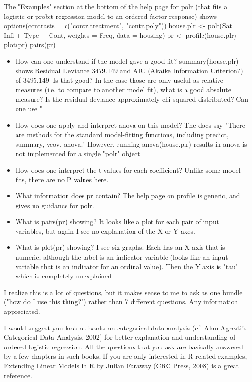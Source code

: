 The "Examples" section at the bottom of the help page for polr (that fits a logistic or probit regression model to an ordered factor response) shows
options(contrasts = c("contr.treatment", "contr.poly"))
house.plr <- polr(Sat ~ Infl + Type + Cont, weights = Freq, data = housing)
pr <- profile(house.plr)
plot(pr)
pairs(pr) 
\begin{itemize}	
\item	How can one understand if the model gave a good fit? summary(house.plr) shows Residual Deviance 3479.149 and AIC (Akaike Information Criterion?) of 3495.149. Is that good? In the case those are only useful as relative measures (i.e. to compare to another model fit), what is a good absolute measure? Is the residual deviance approximately chi-squared distributed? Can one use "%
\item	How does one apply and interpret anova on this model? The docs say "There are methods for the standard model-fitting functions, including predict, summary, vcov, anova." However, running anova(house.plr) results in anova is not implemented for a single "polr" object
\item	How does one interpret the t values for each coefficient? Unlike some model fits, there are no P values here.
\item	What information does pr contain? The help page on profile is generic, and gives no guidance for polr.
\item	What is pairs(pr) showing? It looks like a plot for each pair of input variables, but again I see no explanation of the X or Y axes.
\item	What is plot(pr) showing? I see six graphs. Each has an X axis that is numeric, although the label is an indicator variable (looks like an input variable that is an indicator for an ordinal value). Then the Y axis is "tau" which is completely unexplained.
\end{itemize}	


 
I realize this is a lot of questions, but it makes sense to me to ask as one bundle ("how do I use this thing?") rather than 7 different questions. Any information appreciated.

\newpage
I would suggest you look at books on categorical data analysis (cf. Alan Agresti's Categorical Data Analysis, 2002) for better explanation and understanding of ordered logistic regression. All the questions that you ask are basically answered by a few chapters in such books. If you are only interested in R related examples, Extending Linear Models in R by Julian Faraway (CRC Press, 2008) is a great reference.

